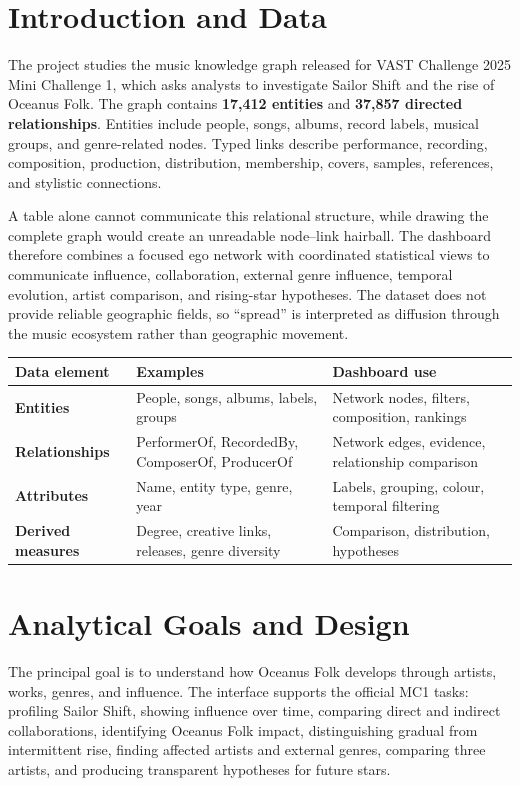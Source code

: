 \documentclass[9pt,a4paper]{article}
\begin{document}
\section{Introduction and Data}
The project studies the music knowledge graph released for VAST Challenge 2025 Mini Challenge 1, which asks analysts to investigate Sailor Shift and the rise of Oceanus Folk. The graph contains \textbf{17,412 entities} and \textbf{37,857 directed relationships}. Entities include people, songs, albums, record labels, musical groups, and genre-related nodes. Typed links describe performance, recording, composition, production, distribution, membership, covers, samples, references, and stylistic connections.

A table alone cannot communicate this relational structure, while drawing the complete graph would create an unreadable node--link hairball. The dashboard therefore combines a focused ego network with coordinated statistical views to communicate influence, collaboration, external genre influence, temporal evolution, artist comparison, and rising-star hypotheses. The dataset does not provide reliable geographic fields, so ``spread'' is interpreted as diffusion through the music ecosystem rather than geographic movement.

\begin{table}[H]\centering\small
\begin{tabularx}{\textwidth}{>{\bfseries}p{2.7cm} >{\raggedright\arraybackslash}X >{\raggedright\arraybackslash}X}
\toprule
Data element & Examples & Dashboard use \\
\midrule
Entities & People, songs, albums, labels, groups & Network nodes, filters, composition, rankings \\
Relationships & PerformerOf, RecordedBy, ComposerOf, ProducerOf & Network edges, evidence, relationship comparison \\
Attributes & Name, entity type, genre, year & Labels, grouping, colour, temporal filtering \\
Derived measures & Degree, creative links, releases, genre diversity & Comparison, distribution, hypotheses \\
\bottomrule
\end{tabularx}
\end{table}

\section{Analytical Goals and Design}
The principal goal is to understand how Oceanus Folk develops through artists, works, genres, and influence. The interface supports the official MC1 tasks: profiling Sailor Shift, showing influence over time, comparing direct and indirect collaborations, identifying Oceanus Folk impact, distinguishing gradual from intermittent rise, finding affected artists and external genres, comparing three artists, and producing transparent hypotheses for future stars.
\end{document}
